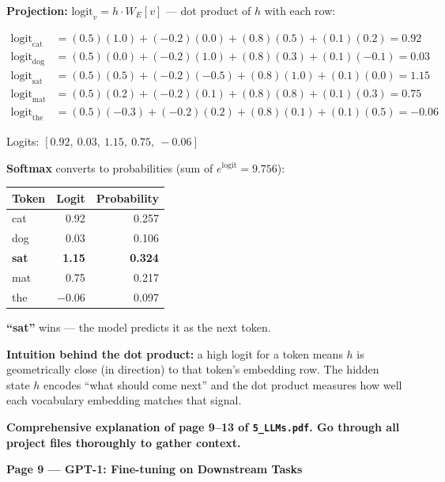 \medskip
\noindent\textbf{Projection:} $\mathrm{logit}_v = h \cdot W_E[v]$ --- dot product of $h$ with each row:

\begin{align*}
\mathrm{logit}_{\mathrm{cat}} &= (0.5)(1.0) + (-0.2)(0.0) + (0.8)(0.5) + (0.1)(0.2) = 0.92 \\
\mathrm{logit}_{\mathrm{dog}} &= (0.5)(0.0) + (-0.2)(1.0) + (0.8)(0.3) + (0.1)(-0.1) = 0.03 \\
\mathrm{logit}_{\mathrm{sat}} &= (0.5)(0.5) + (-0.2)(-0.5) + (0.8)(1.0) + (0.1)(0.0) = 1.15 \\
\mathrm{logit}_{\mathrm{mat}} &= (0.5)(0.2) + (-0.2)(0.1) + (0.8)(0.8) + (0.1)(0.3) = 0.75 \\
\mathrm{logit}_{\mathrm{the}} &= (0.5)(-0.3) + (-0.2)(0.2) + (0.8)(0.1) + (0.1)(0.5) = -0.06
\end{align*}

\noindent Logits: $[0.92,\ 0.03,\ 1.15,\ 0.75,\ -0.06]$

\medskip
\noindent\textbf{Softmax} converts to probabilities (sum of $e^{\mathrm{logit}} = 9.756$):

\medskip
\begin{tabular}{|l|r|r|}
\hline
Token & Logit & Probability \\
\hline
cat          & 0.92  & 0.257 \\
dog          & 0.03  & 0.106 \\
\textbf{sat} & \textbf{1.15} & \textbf{0.324} \\
mat          & 0.75  & 0.217 \\
the          & $-0.06$ & 0.097 \\
\hline
\end{tabular}

\medskip
\noindent\textbf{``sat''} wins --- the model predicts it as the next token.

\medskip
\noindent\textbf{Intuition behind the dot product:} a high logit for a token means $h$ is geometrically close (in direction) to that token's embedding row. The hidden state $h$ encodes ``what should come next'' and the dot product measures how well each vocabulary embedding matches that signal.

\bigskip

\textbf{Comprehensive explanation of page 9--13 of \texttt{5\_LLMs.pdf}. Go through all project files thoroughly to gather context.}

\medskip
\noindent\textbf{Page 9 --- GPT-1: Fine-tuning on Downstream Tasks}


